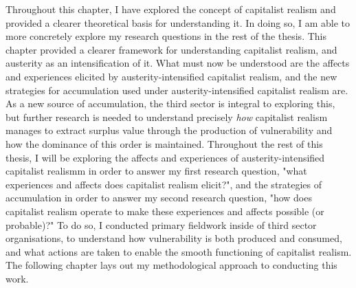 Throughout this chapter, I have explored the concept of capitalist realism and provided a clearer theoretical basis for understanding it. In doing so, I am able to more concretely explore my research questions in the rest of the thesis. This chapter provided a clearer framework for understanding capitalist realism, and austerity as an intensification of it. What must now be understood are the affects and experiences elicited by austerity-intensified capitalist realism, and the new strategies for accumulation used under austerity-intensified capitalist realism are. As a new source of accumulation, the third sector is integral to exploring this, but further research is needed to understand precisely \emph{how} capitalist realism manages to extract surplus value through the production of vulnerability and how the dominance of this order is maintained. Throughout the rest of this thesis, I will be exploring the affects and experiences of austerity-intensified capitalist realismm in order to answer my first research question, "what experiences and affects does capitalist realism elicit?", and the strategies of accumulation in order to answer my second research question, "how does capitalist realism operate to make these experiences and affects possible (or probable)?" To do so, I conducted primary fieldwork inside of third sector organisations, to understand how vulnerability is both produced and consumed, and what actions are taken to enable the smooth functioning of capitalist realism. The following chapter lays out my methodological approach to conducting this work.